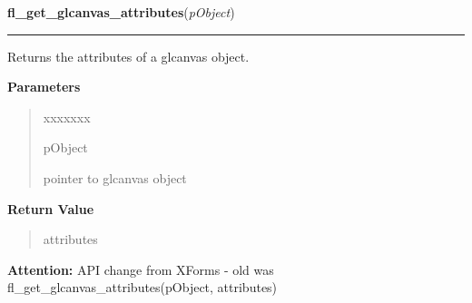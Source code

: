     \label{xformslib:library:fl_get_glcanvas_attributes}

    \vspace{0.5ex}

\hspace{.8\funcindent}\begin{boxedminipage}{\funcwidth}

    \raggedright \textbf{fl\_get\_glcanvas\_attributes}(\textit{pObject})

    \vspace{-1.5ex}

    \rule{\textwidth}{0.5\fboxrule}
\setlength{\parskip}{2ex}
    Returns the attributes of a glcanvas object.

\setlength{\parskip}{1ex}
      \textbf{Parameters}
      \vspace{-1ex}

      \begin{quote}
        \begin{Ventry}{xxxxxxx}

          \item[pObject]

          pointer to glcanvas object

        \end{Ventry}

      \end{quote}

      \textbf{Return Value}
    \vspace{-1ex}

      \begin{quote}
      attributes

      \end{quote}

\textbf{Attention:} API change from XForms - old was fl\_get\_glcanvas\_attributes(pObject, 
attributes)



    \end{boxedminipage}

    \label{xformslib:library:fl_set_glcanvas_direct}

    \vspace{0.5ex}

